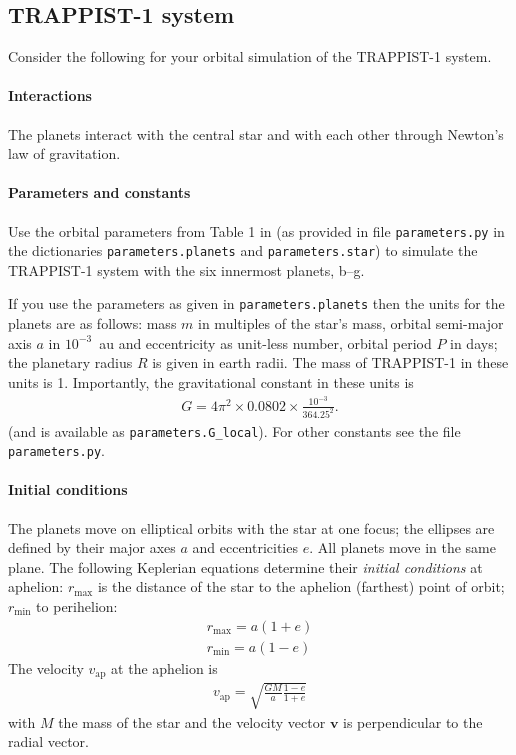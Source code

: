 \documentclass[letterpaper]{scrartcl}
\renewcommand{\vec}[1]{\ensuremath{\mathbf{#1}}}
\begin{document}
\subsection{TRAPPIST-1 system}
\label{sec:system}

Consider the following for your orbital simulation of the TRAPPIST-1 system.

\paragraph{Interactions}

The planets interact with the central star and with each other through
Newton's law of gravitation.

\paragraph{Parameters and constants}

Use the orbital parameters from Table 1 in \citet{Gillon:2017aa} (as
provided in file \texttt{parameters.py} in the dictionaries
\texttt{parameters.planets} and \texttt{parameters.star}) to simulate
the TRAPPIST-1 system with the six innermost planets, b--g.

If you use the parameters as given in \texttt{parameters.planets} then
the units for the planets are as follows: mass $m$ in multiples of the
star's mass, orbital semi-major axis $a$ in $10^{-3}$~au and
eccentricity as unit-less number, orbital period $P$ in days; the
planetary radius $R$ is given in earth radii. The mass of TRAPPIST-1
in these units is 1. Importantly, the gravitational constant in these
units is
\begin{gather}
  \label{eq:G}
  G = 4\pi^{2} \times 0.0802 \times \frac{10^{-3}}{364.25^{2}}.
\end{gather}
(and is available as \texttt{parameters.G\_local}). For other
constants see the file \texttt{parameters.py}.


\paragraph{Initial conditions}

The planets move on elliptical orbits with the star at one focus; the
ellipses are defined by their major axes $a$ and eccentricities
$e$. All planets move in the same plane. The following Keplerian
equations determine their \emph{initial conditions} at aphelion:
$r_\text{max}$ is the distance of the star to the aphelion (farthest)
point of orbit; $r_\text{min}$ to perihelion:
\begin{gather}
  r_\text{max} = a(1+e)\label{eq:aphelion}\\
  r_\text{min} = a(1-e)\label{eq:perihelion}
\end{gather}
The velocity $v_\text{ap}$ at the aphelion is
\begin{gather}
  \label{eq:vap}  
  v_\text{ap} = \sqrt{\frac{GM}{a} \frac{1-e}{1+e}}
\end{gather}
with $M$ the mass of the star and the velocity vector $\vec{v}$ is
perpendicular to the radial vector.
\end{document}
